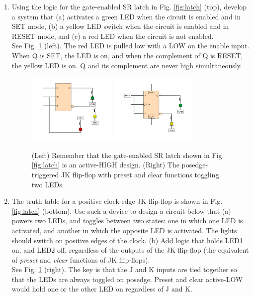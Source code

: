 \documentclass[10pt]{article}
\begin{document}
\begin{enumerate}
\item Using the logic for the gate-enabled SR latch in Fig. \ref{fig:latch} (top), develop a system that (a) activates a green LED when the circuit is enabled and in SET mode, (b) a yellow LED switch when the circuit is enabled and in RESET mode, and (c) a red LED when the circuit is not enabled. \\

See Fig. \ref{fig:latchDesign} (left).  The red LED is pulled low with a LOW on the enable input.  When Q is SET, the LED is on, and when the complement of Q is RESET, the yellow LED is on.  Q and its complement are never high simultaneously.

\begin{figure}[hb]
\centering
\includegraphics[width=0.4\textwidth]{figures/design2.pdf} \hspace{0.5cm}
\includegraphics[width=0.4\textwidth]{figures/design3.pdf}
\caption{\label{fig:latchDesign} (Left) Remember that the gate-enabled SR latch shown in Fig. \ref{fig:latch} is an active-HIGH design. (Right) The posedge-triggered JK flip-flop with preset and clear functions toggling two LEDs.}
\end{figure}
\item The truth table for a positive clock-edge JK flip-flop is shown in Fig. \ref{fig:latch} (bottom).  Use such a device to design a circuit below that (a) powers two LEDs, and toggles between two states: one in which one LED is activated, and another in which the opposite LED is activated. The lights should switch on positive edges of the clock.  (b) Add logic that holds LED1 on, and LED2 off, regardless of the outputs of the JK flip-flop (the equivalent of \textit{preset} and \textit{clear} functions of JK flip-flops). \\

See Fig. \ref{fig:latchDesign} (right).  The key is that the J and K inputs are tied together so that the LEDs are always toggled on posedge. Preset and clear active-LOW would hold one or the other LED on regardless of J and K.
\end{enumerate}
\end{document}
